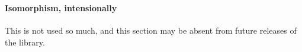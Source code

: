 \begin{code}
\AgdaSymbol{(}\AgdaSpace{}%
\AgdaSymbol{:}\AgdaSpace{}%
\AgdaSymbol{)}\AgdaSpace{}%
\AgdaSpace{}%
\AgdaSymbol{(}\AgdaSpace{}%
\AgdaSymbol{)}\AgdaSpace{}%
\AgdaSymbol{(}\AgdaSpace{}%
\AgdaSymbol{))}\<%
\\
\>[0]\AgdaSpace{}%
\AgdaSymbol{\{}\AgdaSymbol{\}}\AgdaSpace{}%
\AgdaSymbol{\{}\AgdaSymbol{\}}\AgdaSpace{}%
\AgdaSymbol{\{}\AgdaSymbol{\}}\AgdaSpace{}%
\AgdaSpace{}%
\AgdaSpace{}%
\AgdaSymbol{\{}\AgdaSymbol{\}}\AgdaSpace{}%
\AgdaSymbol{\{}\AgdaSymbol{\}}\AgdaSpace{}%
\AgdaSymbol{\{}\AgdaSymbol{\}}\AgdaSpace{}%
\AgdaSpace{}%
\AgdaSpace{}%
\AgdaSymbol{=}\<%
\\
\>[0][@{}l@{\AgdaIndent{0}}]%
\>[1]\AgdaSpace{}%
\AgdaSymbol{\{}\AgdaSymbol{\}}\AgdaSpace{}%
\AgdaSymbol{\{}\AgdaSymbol{\}}\AgdaSpace{}%
\AgdaSymbol{\{}\AgdaSymbol{\}}\AgdaSpace{}%
\AgdaSpace{}%
\AgdaSpace{}%
\AgdaSymbol{\{}\AgdaSymbol{\}}\AgdaSpace{}%
\AgdaSymbol{\{}\AgdaSymbol{\}}\AgdaSpace{}%
\AgdaSymbol{\{}\AgdaSymbol{\}}\AgdaSpace{}%
\AgdaSpace{}%
\<%
\end{code}

\paragraph{Isomorphism, intensionally}\label{isomorphism-intensionally}

This is not used so much, and this section may be absent from future
releases of the library.

